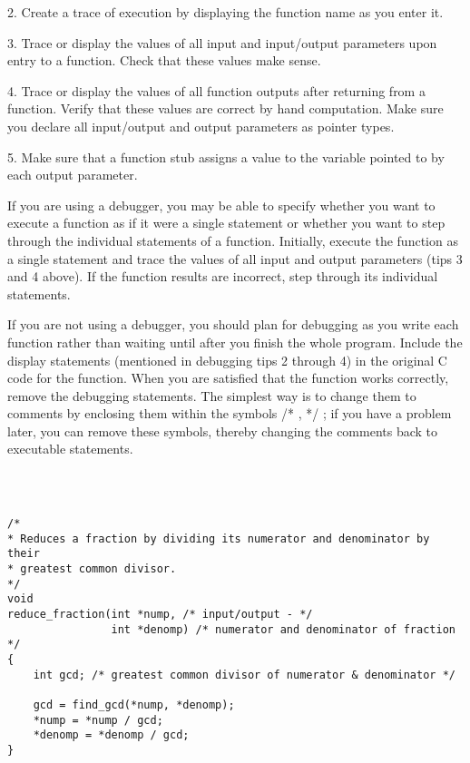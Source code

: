 \documentclass{extarticle}
\begin{document}
2. Create a trace of execution by displaying the function name as you enter it.

3. Trace or display the values of all input and input/output parameters upon entry to a function. Check that these values make sense.

4. Trace or display the values of all function outputs after returning from a function. Verify that these values are correct by hand computation. Make sure you declare all input/output and output parameters as pointer types.

5. Make sure that a function stub assigns a value to the variable pointed to by each output parameter.



If you are using a debugger, you may be able to specify whether you want to execute a function as if it were a single statement or whether you want to step through the individual statements of a function. Initially, execute the function as a single statement and trace the values of all input and output parameters (tips 3 and 4 above). If the function results are incorrect, step through its individual statements.

If you are not using a debugger, you should plan for debugging as you write each function rather than waiting until after you finish the whole program. Include the display statements (mentioned in debugging tips 2 through 4) in the original C code for the function. When you are satisfied that the function works correctly, remove the debugging statements. The simplest way is to change them to comments by enclosing them within the symbols /* , */ ; if you have a problem later, you can remove these symbols, thereby changing the comments back to executable statements.








\begin{verbatim}



/*
* Reduces a fraction by dividing its numerator and denominator by their
* greatest common divisor.
*/
void
reduce_fraction(int *nump, /* input/output - */
                int *denomp) /* numerator and denominator of fraction */
{
    int gcd; /* greatest common divisor of numerator & denominator */

    gcd = find_gcd(*nump, *denomp);
    *nump = *nump / gcd;
    *denomp = *denomp / gcd;
}


\end{verbatim}
\end{document}
